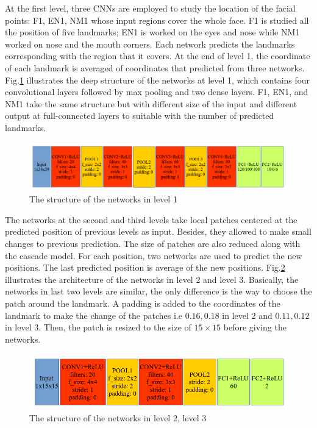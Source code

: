 At the first level, three CNNs are employed to study the location of the facial points: F1, EN1, NM1 whose input regions cover the whole face. F1 is studied all the position of five landmarks; EN1 is worked on the eyes and nose while NM1 worked on nose and the mouth corners. Each network predicts the landmarks corresponding with the region that it covers. At the end of level 1, the coordinate of each landmark is averaged of coordinates that predicted from three networks. Fig.\ref{1Fconv} illustrates the deep structure of the networks at level 1, which contains four convolutional layers followed by max pooling and two dense layers. F1, EN1, and NM1 take the same structure but with different size of the input and different output at full-connected layers to suitable with the number of predicted landmarks.
\begin{figure}[h]
	\centering
	\includegraphics[scale=0.5]{images/cnn_level1}
	\caption{The structure of the networks in level 1}
	\label{1Fconv}
\end{figure}

The networks at the second and third levels take local patches centered at the predicted position of previous levels as input. Besides, they allowed to make small changes to previous prediction. The size of patches are also reduced along with the cascade model. For each position, two networks are used to predict the new positions. The last predicted position is average of the new positions. Fig.\ref{2lvconv} illustrates the architecture of the networks in level 2 and level 3. Basically, the networks in last two levels are similar, the only difference is the way to choose the patch around the landmark. A padding is added to the coordinates of the landmark to make the change of the patches i.e $0.16, 0.18$ in level 2 and $0.11, 0.12$ in level 3. Then, the patch is resized to the size of $15 \times 15$ before giving the networks.
\begin{figure}[h]
	\centering
	\includegraphics[scale=0.5]{images/cnn_level2}
	\caption{The structure of the networks in level 2, level 3}
	\label{2lvconv}
\end{figure}

